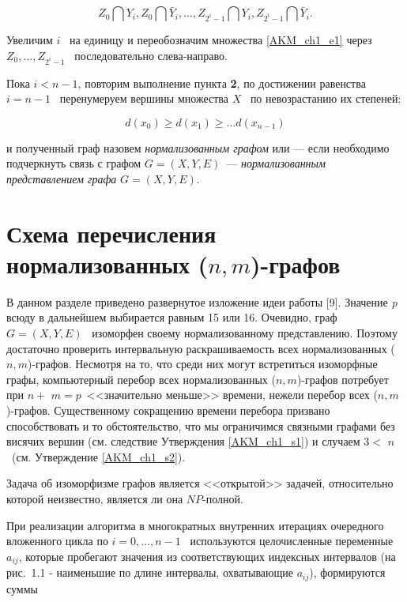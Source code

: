 \begin{equation}\label{AKM_ch1_e1}
Z_0\bigcap Y_i, Z_0\bigcap \bar{Y}_i,\dots , Z_{2^i-1}\bigcap Y_i, Z_{2^i-1}\bigcap \bar{Y}_i.
\end{equation}

Увеличим  $i$ \ на единицу и переобозначим множества \eqref{AKM_ch1_e1} через  $Z_0,\dots ,Z_{2^i-1}$ \ последовательно слева-направо.

Пока  $i<n-1$, повторим выполнение пункта \textbf{2}, по достижении равенства  $i=n-1$ \ перенумеруем вершины множества
$X$ \ по невозрастанию их степеней:

\begin{equation}\label{AKM_ch1_e2}
d\left(x_0\right)\geq d\left(x_1\right)\geq \dots d(x_{n-1})
\end{equation}

и полученный граф назовем \textit{нормализованным графом }или --- если необходимо подчеркнуть связь с графом
$G=(X,Y,E)$\ --- \textit{нормализованным представлением графа}  $G=(X,Y,E)$.

\section{Схема перечисления нормализованных ($n,m$)-графов}\label{AKM_ch1_4}
\hypertarget{Toc503377125}{}В данном разделе приведено развернутое изложение идеи работы [9]. Значение
\foreignlanguage{english}{\textit{p}} всюду в дальнейшем выбирается равным 15 или 16. Очевидно, граф  $G=(X,Y,E)$
\ изоморфен своему нормализованному представлению. Поэтому достаточно проверить интервальную раскрашиваемость всех
нормализованных ($n,m$)-графов. Несмотря на то, что среди них могут встретиться изоморфные графы, компьютерный перебор
всех нормализованных ($n,m$)-графов потребует при  $n+\text{~}m=p$\ <<значительно меньше>> времени, нежели перебор всех
($n,m$)-графов. Существенному сокращению времени перебора призвано способствовать и то обстоятельство, что мы
ограничимся связными графами без висячих вершин (см. следствие Утверждения \ref{AKM_ch1_s1}) и случаем  $3<\text{~}n$\ (см.
Утверждение \ref{AKM_ch1_s2}).

\begin{remark}\label{AKM_ch1_r1}
	Задача об изоморфизме графов является <<открытой>> задачей, относительно которой неизвестно, является ли она
	$\mathit{NP}${}-полной.
\end{remark}

При реализации алгоритма в многократных внутренних итерациях очередного вложенного цикла по  $i=0,\dots ,n-1$
\ используются целочисленные переменные  $a_{\mathit{ij}}$, которые пробегают значения из соответствующих индексных
интервалов (на рис.~1.1 - наименьшие по длине интервалы, охватывающие  $a_{\mathit{ij}}$), формируются суммы

